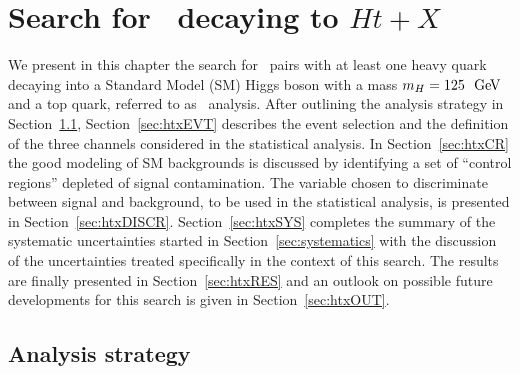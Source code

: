 \clearpage{\pagestyle{empty}\cleardoublepage}

\chapter{Search for \TTbar\ decaying to $Ht+X$}\label{chap:htx}

We present in this chapter the search for \TTbar\ pairs with
at least one heavy quark decaying into a Standard Model (SM) Higgs boson 
with a mass $m_H= 125~\gev$ and a top
quark, referred to as \htx\ analysis.
After outlining the analysis strategy in Section~\ref{sec:htxMULT},
Section~\ref{sec:htxEVT} describes the event selection and the
definition of the three channels considered in the statistical analysis.
In Section~\ref{sec:htxCR} the good modeling of SM backgrounds
is discussed by identifying a set of ``control regions'' depleted of
signal contamination. The variable chosen to discriminate between
signal and background, to be used in the statistical analysis,
is presented in Section~\ref{sec:htxDISCR}.
Section~\ref{sec:htxSYS} completes the summary of the 
systematic uncertainties started in Section~\ref{sec:systematics}
with the discussion of the uncertainties treated specifically
in the context of this search.
The results are finally presented in Section~\ref{sec:htxRES}
and an outlook on possible future developments for this search is given
in Section~\ref{sec:htxOUT}.

\section{Analysis strategy}\label{sec:htxMULT}

